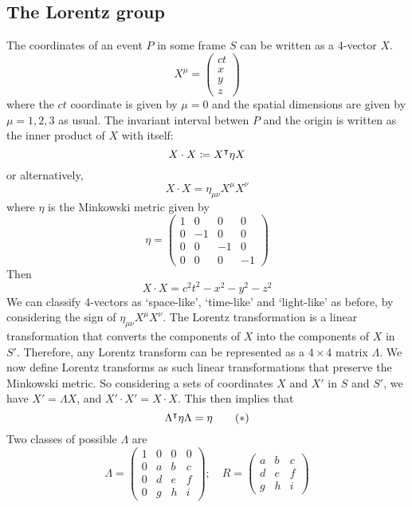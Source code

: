\subsection{The Lorentz group}
The coordinates of an event \(P\) in some frame \(S\) can be written as a 4-vector \(X\).
\[
	X^\mu = \begin{pmatrix}
		ct \\ x \\ y \\ z
	\end{pmatrix}
\]
where the \(ct\) coordinate is given by \(\mu = 0\) and the spatial dimensions are given by \(\mu = 1, 2, 3\) as usual.
The invariant interval betwen \(P\) and the origin is written as the inner product of \(X\) with itself:
\[
	X \cdot X \coloneq X^\intercal \eta X
\]
or alternatively,
\[
	X \cdot X = \eta_{\mu\nu} X^\mu X^\nu
\]
where \(\eta\) is the Minkowski metric given by
\[
	\eta = \begin{pmatrix}
		1 & 0  & 0  & 0  \\
		0 & -1 & 0  & 0  \\
		0 & 0  & -1 & 0  \\
		0 & 0  & 0  & -1
	\end{pmatrix}
\]
Then
\[
	X \cdot X = c^2t^2 - x^2 - y^2 - z^2
\]
We can classify 4-vectors as `space-like', `time-like' and `light-like' as before, by considering the sign of \(\eta_{\mu\nu}X^\mu X^\nu\).
The Lorentz transformation is a linear transformation that converts the components of \(X\) into the components of \(X\) in \(S'\).
Therefore, any Lorentz transform can be represented as a \(4\times 4\) matrix \(\Lambda\).
We now define Lorentz transforms as such linear transformations that preserve the Minkowski metric.
So considering a sets of coordinates \(X\) and \(X'\) in \(S\) and \(S'\), we have \(X' = \Lambda X\), and \(X' \cdot X' = X \cdot X\).
This then implies that
\begin{equation}
	\Lambda^\intercal \eta \Lambda = \eta \tag{\(\ast\)}
\end{equation}
Two classes of possible \(\Lambda\) are
\[
	\Lambda = \begin{pmatrix}
		1 & 0 & 0 & 0 \\
		0 & a & b & c \\
		0 & d & e & f \\
		0 & g & h & i
	\end{pmatrix};\quad R = \begin{pmatrix}
		a & b & c \\
		d & e & f \\
		g & h & i
	\end{pmatrix}
\]
